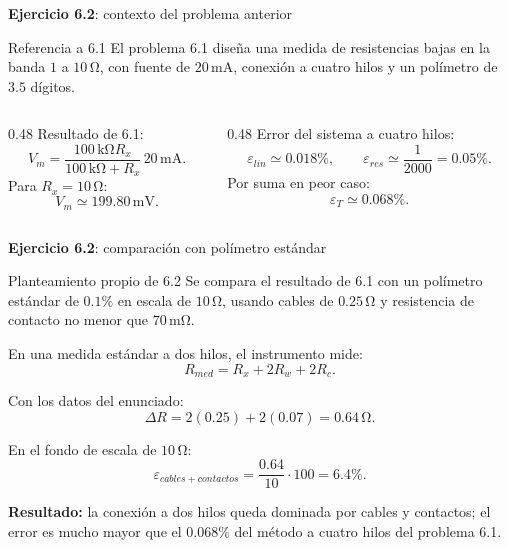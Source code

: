 \documentclass[aspectratio=169,9pt]{beamer}
\newcommand{\exercise}[1]{\textbf{Ejercicio #1}}
\newcommand{\result}[1]{\textbf{\color{eiTeal}Resultado:} #1}
\newcommand{\unit}[1]{\,\mathrm{#1}}
\begin{document}
\begin{frame}{\exercise{6.2}: contexto del problema anterior}
  \begin{block}{Referencia a 6.1}
    El problema 6.1 diseña una medida de resistencias bajas en la banda \(1\) a \(10\unit{\Omega}\), con fuente de \(20\unit{mA}\), conexión a cuatro hilos y un polímetro de \(3.5\) dígitos.
  \end{block}

  \begin{columns}[T,onlytextwidth]
    \begin{column}{0.48\textwidth}
      Resultado de 6.1:
      \[
        V_m=\frac{100\unit{k\Omega}R_x}{100\unit{k\Omega}+R_x}\,20\unit{mA}.
      \]
      Para \(R_x=10\unit{\Omega}\):
      \[
        V_m\simeq199.80\unit{mV}.
      \]
    \end{column}
    \begin{column}{0.48\textwidth}
      Error del sistema a cuatro hilos:
      \[
        \varepsilon_{lin}\simeq0.018\%,
        \qquad
        \varepsilon_{res}\simeq\frac{1}{2000}=0.05\%.
      \]
      Por suma en peor caso:
      \[
        \varepsilon_T\simeq0.068\%.
      \]
    \end{column}
  \end{columns}
\end{frame}

\begin{frame}{\exercise{6.2}: comparación con polímetro estándar}
  \begin{block}{Planteamiento propio de 6.2}
    Se compara el resultado de 6.1 con un polímetro estándar de \(0.1\%\) en escala de \(10\unit{\Omega}\), usando cables de \(0.25\unit{\Omega}\) y resistencia de contacto no menor que \(70\unit{m\Omega}\).
  \end{block}

  En una medida estándar a dos hilos, el instrumento mide:
  \[
    R_{med}=R_x+2R_w+2R_c.
  \]

  Con los datos del enunciado:
  \[
    \Delta R=2(0.25)+2(0.07)=0.64\unit{\Omega}.
  \]

  En el fondo de escala de \(10\unit{\Omega}\):
  \[
    \varepsilon_{cables+contactos}=\frac{0.64}{10}\cdot100=6.4\%.
  \]

  \result{la conexión a dos hilos queda dominada por cables y contactos; el error es mucho mayor que el \(0.068\%\) del método a cuatro hilos del problema 6.1.}
\end{frame}
\end{document}
